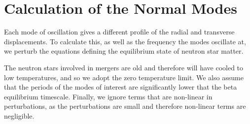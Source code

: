 \documentclass[fleqn,usenatbib]{mnras}
\begin{document}
\section{Calculation of the Normal Modes}
\hspace{\parindent}Each mode of oscillation gives a different profile of the radial and transverse displacements. To calculate this, as well as the frequency the modes oscillate at, we perturb the equations defining the equilibrium state of neutron star matter.

\hspace{\parindent}The neutron stars involved in mergers are old and therefore will have cooled to low temperatures, and so we adopt the zero temperature limit. We also assume that the periods of the modes of interest are significantly lower that the beta equilibrium timescale. Finally, we ignore terms that are non-linear in perturbations, as the perturbations are small and therefore non-linear terms are negligible.




\end{document}
